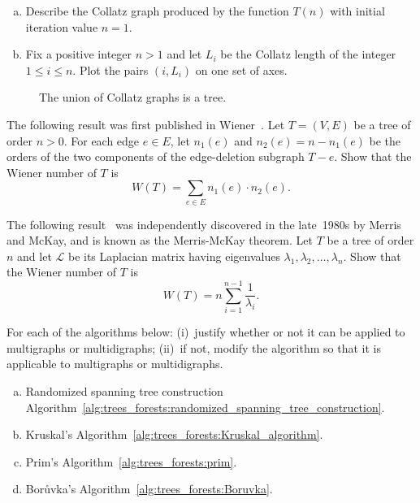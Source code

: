 \begin{problem}
\begin{enumerate}[(a)]
  \item Describe the Collatz graph produced by the function $T(n)$
    with initial iteration value $n = 1$.

  \item Fix a positive integer $n > 1$ and let $L_i$ be the Collatz
    length of the integer $1 \leq i \leq n$. Plot the pairs $(i, L_i)$
    on one set of axes.
  \end{enumerate}

\begin{figure}[!htbp]
\centering

\caption{The union of Collatz graphs is a tree.}
\label{fig:trees_forests:Collatz_graph_union}
\end{figure}

\item The following result was first published in
  Wiener~\cite{Wiener1947}. Let $T = (V,E)$ be a tree of order $n > 0$.
  For each edge $e \in E$, let $n_1(e)$ and $n_2(e) = n - n_1(e)$ be
  the orders of the two components of the edge-deletion subgraph
  $T - e$. Show that the Wiener number of $T$ is
  \[
  W(T)
  =
  \sum_{e \in E} n_1(e) \cdot n_2(e).
  \]

\item The following result~\cite{MoharEtAl1993} was independently
  discovered in the late~1980s by Merris and McKay, and is known as
  the Merris-McKay theorem. Let $T$ be a tree of order $n$ and let
  $\mathcal{L}$ be its Laplacian matrix having eigenvalues
  $\lambda_1, \lambda_2, \dots, \lambda_n$. Show that the Wiener
  number of $T$ is
  \[
  W(T)
  =
  n \sum_{i=1}^{n-1} \frac{1}{\lambda_i}.
  \]

\item For each of the algorithms below: (i)~justify whether or not
  it can be applied to multigraphs or multidigraphs; (ii)~if not,
  modify the algorithm so that it is applicable to multigraphs or
  multidigraphs.
  \begin{enumerate}[(a)]
  \item Randomized spanning tree construction
    Algorithm~\ref{alg:trees_forests:randomized_spanning_tree_construction}.

  \item Kruskal's Algorithm~\ref{alg:trees_forests:Kruskal_algorithm}.

  \item Prim's Algorithm~\ref{alg:trees_forests:prim}.

  \item Bor\r{u}vka's Algorithm~\ref{alg:trees_forests:Boruvka}.
  \end{enumerate}
\end{problem}
